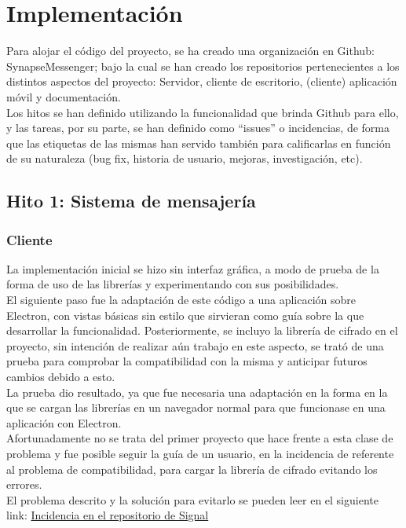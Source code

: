 \chapter{Implementación}

Para alojar el código del proyecto, se ha creado una organización en Github: SynapseMessenger; bajo la cual se han creado los repositorios pertenecientes a los distintos aspectos del proyecto: Servidor, cliente de escritorio, (cliente) aplicación móvil y documentación. \\ 

Los hitos se han definido utilizando la funcionalidad que brinda Github para ello, y las tareas, por su parte, se han definido como \hyphenquote{spanish}{issues} o incidencias, de forma que las etiquetas de las mismas han servido también para calificarlas en función de su naturaleza (bug fix, historia de usuario, mejoras, investigación, etc). \\

\section {Hito 1: Sistema de mensajería}

\subsection{Cliente}
La implementación inicial se hizo sin interfaz gráfica, a modo de prueba de la forma de uso de las librerías y experimentando con sus posibilidades. \\
El siguiente paso fue la adaptación de este código a una aplicación sobre Electron, con vistas básicas sin estilo que sirvieran como guía sobre la que desarrollar la funcionalidad. 
Posteriormente, se incluyo la librería de cifrado en el proyecto, sin intención de realizar aún trabajo en este aspecto, se trató de una prueba para comprobar la compatibilidad con la misma y anticipar futuros cambios debido a esto. \\
La prueba dio resultado, ya que fue necesaria una adaptación en la forma en la que se cargan las librerías en un navegador normal para que funcionase en una aplicación con Electron. \\ 
Afortunadamente no se trata del primer proyecto que hace frente a esta clase de problema y fue posible seguir la guía de un usuario, en la incidencia de referente al problema de compatibilidad, para cargar la librería de cifrado evitando los errores. \\ 
El problema descrito y la solución para evitarlo se pueden leer en el siguiente link:
\href{https://github.com/WhisperSystems/libsignal-protocol-javascript/issues/6}{Incidencia en el repositorio de Signal} \\

